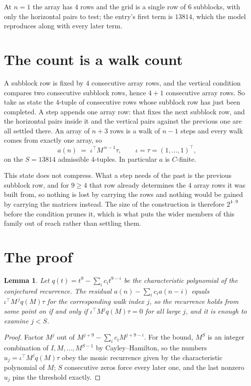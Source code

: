 \documentclass[11pt,a4paper]{article}
\theoremstyle{plain}
\newtheorem{lemma}[theorem]{Lemma}
\theoremstyle{definition}
\begin{document}
At $n=1$ the array has $4$ rows and the grid is a single row of $6$
subblocks, with only the horizontal pairs to test; the entry's first term is
$13814$, which the model reproduces along with every later term.

\section{The count is a walk count}

A subblock row is fixed by $4$ consecutive array rows, and the vertical condition compares
two consecutive subblock rows, hence $4+1$ consecutive array rows. So take as state the
$4$-tuple of consecutive rows whose subblock row has just been completed. A step appends one
array row: that fixes the next subblock row, and the horizontal pairs inside it and the
vertical pairs against the previous one are all settled there. An array of $n+3$ rows is
a walk of $n-1$ steps and every walk comes from exactly one array, so
\[
a(n)\;=\;\iota^{\!\top}M^{\,n-1}\tau,\qquad\iota=\tau=(1,\dots,1)^{\!\top},
\]
on the $S=13814$ admissible $4$-tuples. In particular $a$ is $C$-finite.

This state does not compress. What a step needs of the past is the previous subblock row, and
for $9\ge4$ that row already determines the $4$ array rows it was built from, so nothing
is lost by carrying the rows and nothing would be gained by carrying the matrices instead. The
size of the construction is therefore $2^{4\cdot9}$ before the condition prunes
it, which is what puts the wider members of this family out of reach rather than settling them.

\section{The proof}

\begin{lemma}\label{lem:crit}
Let $q(t)=t^{9}-\sum_i c_it^{9-i}$ be the characteristic polynomial of the
conjectured recurrence. The residual $a(n)-\sum_ic_ia(n-i)$ equals
$\iota^{\!\top}M^{\,j}q(M)\tau$ for the corresponding walk index $j$, so the recurrence
holds from some point on if and only if $\iota^{\!\top}M^{j}q(M)\tau=0$ for all large $j$,
and it is enough to examine $j<S$.
\end{lemma}

\begin{proof}
Factor $M^{j}$ out of $M^{j+9}-\sum_ic_iM^{j+9-i}$. For the bound, $M^{S}$
is an integer combination of $I,M,\dots,M^{S-1}$ by Cayley--Hamilton, so the numbers
$u_j=\iota^{\!\top}M^{j}q(M)\tau$ obey the monic recurrence given by the characteristic
polynomial of $M$; $S$ consecutive zeros force every later one, and the last nonzero $u_j$
pins the threshold exactly.
\end{proof}
\end{document}

